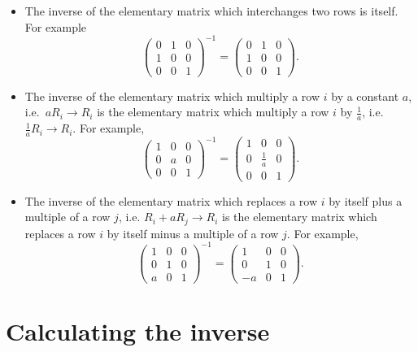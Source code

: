 \documentclass[
  a4paper,
  DIV=11,
  numbers=noendperiod,
  oneside]{scrreprt}
\theoremstyle{definition}
\theoremstyle{remark}
\begin{document}
\begin{itemize}
\item
  The inverse of the elementary matrix which interchanges two rows is
  itself. For example
  \[\left(\begin{array}{ccc}0 & 1 & 0\\ 1 & 0 & 0 \\ 0 & 0 & 1\end{array}\right)^{-1} =\left(\begin{array}{ccc}0 & 1 & 0\\ 1 & 0 & 0 \\ 0 & 0 & 1\end{array}\right).\]
\item
  The inverse of the elementary matrix which multiply a row \(i\) by a
  constant \(a\), i.e.~\(aR_{i}\rightarrow R_{i}\) is the elementary
  matrix which multiply a row \(i\) by \(\frac{1}{a}\),
  i.e.~\(\frac{1}{a}R_{i}\rightarrow R_{i}\). For example,
  \[\left(\begin{array}{ccc}1 & 0 & 0\\ 0 & a & 0 \\ 0 & 0 & 1\end{array}\right)^{-1} =\left(\begin{array}{ccc}1 & 0 & 0\\ 0 & \frac{1}{a} & 0 \\ 0 & 0 & 1\end{array}\right).\]
\item
  The inverse of the elementary matrix which replaces a row \(i\) by
  itself plus a multiple of a row \(j\), i.e.
  \(R_{i}+aR_{j}\rightarrow R_{i}\) is the elementary matrix which
  replaces a row \(i\) by itself minus a multiple of a row \(j\). For
  example,
  \[\left(\begin{array}{ccc}1 & 0 & 0\\ 0 & 1 & 0 \\ a & 0 & 1\end{array}\right)^{-1}=\left(\begin{array}{ccc}1 & 0 & 0\\ 0 & 1 & 0 \\ -a & 0 & 1\end{array}\right).\]
\end{itemize}

\section{Calculating the inverse}\label{calculating-the-inverse}
\end{document}
